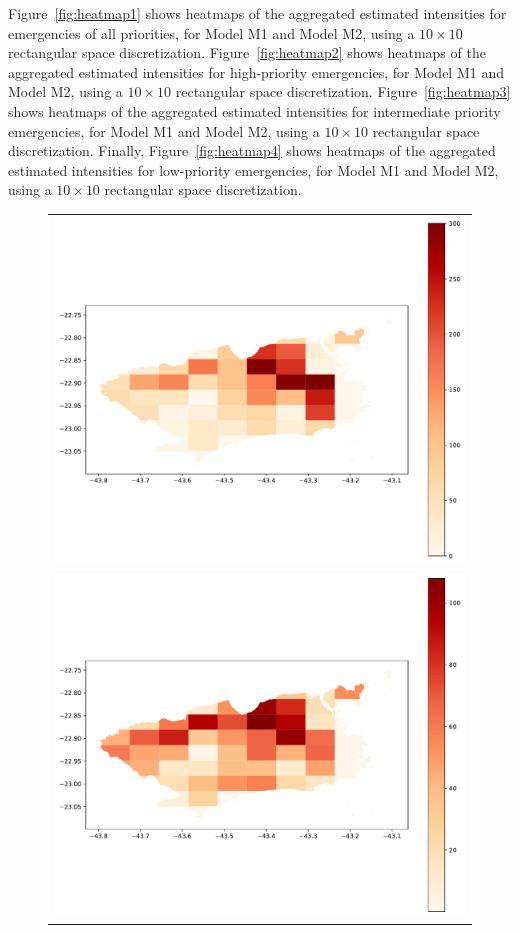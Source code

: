 \documentclass[article]{jss}
\begin{document}
Figure~\ref{fig:heatmap1} shows heatmaps of the aggregated estimated intensities for emergencies of all priorities, for Model M1 and Model M2, using a $10 \times 10$ rectangular space discretization.
Figure~\ref{fig:heatmap2} shows heatmaps of the aggregated estimated intensities for high-priority emergencies, for Model M1 and Model M2, using a $10 \times 10$ rectangular space discretization.
Figure~\ref{fig:heatmap3} shows heatmaps of the aggregated estimated intensities for intermediate priority emergencies, for Model M1 and Model M2, using a $10 \times 10$ rectangular space discretization.
Finally, Figure~\ref{fig:heatmap4} shows heatmaps of the aggregated estimated intensities for low-priority emergencies, for Model M1 and Model M2, using a $10 \times 10$ rectangular space discretization.

\begin{figure}
\centering
\begin{tabular}{c}
\includegraphics[scale=0.5]{heatRect10x10_v3.pdf}\\
\includegraphics[scale=0.5]{heatCovRect10x10_v3.pdf}

\end{tabular}
\end{figure}
\end{document}
